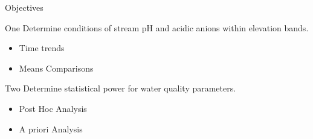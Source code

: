 \begin{frame}{Objectives}
	\begin{block}{One}
			 Determine conditions of stream pH and acidic anions within elevation bands.\pause
				\begin{itemize}
					\item Time trends
					\item Means Comparisons
				\end{itemize}\pause
	\end{block}
	\begin{block}{Two}
			Determine statistical power for water quality parameters.\pause
				\begin{itemize}
					\item Post Hoc Analysis
					\item A priori Analysis 
				\end{itemize}		
	\end{block}
\end{frame}